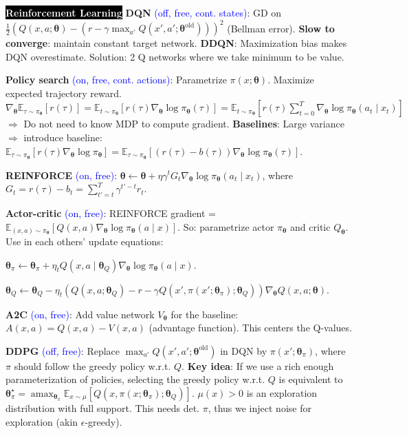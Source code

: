 \documentclass{article}
\newcommand{\blue}[1]{\textcolor{blue}{#1}}
\DeclareMathOperator*{\argmax}{amax}
\newcommand{\E}{\mathbb{E}}
\newenvironment{topic}[1]
{\textbf{\sffamily  \colorbox{black}{\textcolor{white}{#1}}}}
{}
\begin{document}
\begin{multicols*}{3}
\begin{topic}{Reinforcement Learning}
    \textbf{DQN} \blue{(off, free, cont. states)}: GD on
    $\frac{1}{2}(Q(x,a;\bm{\theta}) - (r - \gamma \max_{a'}
    Q(x',a';\bm{\theta}^{\text{old}})))^2$ (Bellman error). \textbf{Slow to
    converge}: maintain constant target network. \textbf{DDQN}: Maximization
    bias makes DQN overestimate. Solution: 2 Q networks where we take minimum
    to be value.

    \textbf{Policy search} \blue{(on, free, cont. actions)}: Parametrize
    $\pi(x; \bm{\theta})$. Maximize expected trajectory reward.
    $\nabla_{\bm{\theta}} \E_{\tau\sim\pi_{\bm{\theta}}}[r(\tau)] =
    \E_{t\sim\pi_{\bm{\theta}}}[r(\tau) \nabla_{\bm{\theta}} \log
    \pi_{\bm{\theta}}(\tau)] = \E_{t\sim\pi_{\bm{\theta}}}[r(\tau) \sum_{t=0}^T
    \nabla_{\bm{\theta}} \log \pi_{\bm{\theta}}(a_t\mid x_t)]$ $\Rightarrow$ Do
    not need to know MDP to compute gradient. \textbf{Baselines}: Large
    variance $\Rightarrow$ introduce baseline:
    $\E_{\tau\sim\pi_{\bm{\theta}}}[r(\tau)\nabla_{\bm{\theta}} \log
    \pi_{\bm{\theta}}] = \E_{\tau\sim\pi_{\bm{\theta}}}[(r(\tau) - b(\tau))
    \nabla_{\bm{\theta}} \log \pi_{\bm{\theta}}(\tau)]$.

    \textbf{REINFORCE} \blue{(on, free)}: $\bm{\theta} \gets \bm{\theta} + \eta
    \gamma^t G_t \nabla_{\bm{\theta}} \log \pi_{\bm{\theta}}(a_t\mid x_t)$,
    where $G_t = r(\tau) - b_t = \sum_{t'=t}^T \gamma^{t'-t} r_t$.

    \textbf{Actor-critic} \blue{(on, free)}: REINFORCE gradient =
    $\E_{(x,a)\sim\pi_{\bm{\theta}}}[Q(x,a)\nabla_{\bm{\theta}} \log
    \pi_{\bm{\theta}}(a\mid x)]$. So: parametrize actor $\pi_{\bm{\theta}}$ and
    critic $Q_{\bm{\theta}}$. Use in each others' update equations:

    $\bm{\theta}_\pi \gets \bm{\theta}_\pi + \eta_t Q(x,a\mid \bm{\theta}_Q) \nabla_{\bm{\theta}} \log \pi_{\bm{\theta}}(a\mid x)$.

    $\bm{\theta}_Q \gets \bm{\theta}_Q - \eta_t (Q(x,a;\bm{\theta}_Q) - r - \gamma Q(x',\pi(x';\bm{\theta}_\pi); \bm{\theta}_Q)) \nabla_{\bm{\theta}}Q(x,a;\bm{\theta})$.

    \textbf{A2C} \blue{(on, free)}: Add value network $V_{\bm{\theta}}$ for the
    baseline: $A(x,a) = Q(x,a) - V(x,a)$ (advantage function). This centers the
    Q-values.

    \textbf{DDPG} \blue{(off, free)}: Replace $\max_{a'}
    Q(x',a';\bm{\theta}^{\text{old}})$ in DQN by $\pi(x';\bm{\theta}_\pi)$,
    where $\pi$ should follow the greedy policy w.r.t. $Q$. \textbf{Key
    idea}: If we use a rich enough parameterization of policies, selecting the
    greedy policy w.r.t. $Q$ is equivalent to $\bm{\theta}_\pi^\star =
    \argmax_{\bm{\theta}_\pi} \E_{x\sim\mu}[Q(x,\pi(x;\bm{\theta}_\pi);
    \bm{\theta}_Q)]$. $\mu(x)>0$ is an exploration distribution with full
    support. This needs det. $\pi$, thus we inject noise for exploration (akin
    $\epsilon$-greedy).


\end{topic}
\end{multicols*}
\end{document}
